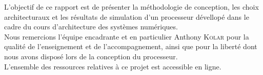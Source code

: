 L'objectif de ce rapport est de présenter la méthodologie de conception, les
choix architecturaux et les résultats de simulation d'un processeur dévellopé
dans le cadre du cours d'architecture des systèmes numériques. \\

Nous remercions l'équipe encadrante et en particulier Anthony \textsc{Kolar}
pour la qualité de l'enseignement et de l'accompagnement, ainsi que pour la
liberté dont nous avons disposé lors de la conception du processeur. \\

L'ensemble des ressources relatives à ce projet est accessible en ligne\cite{repo}.
